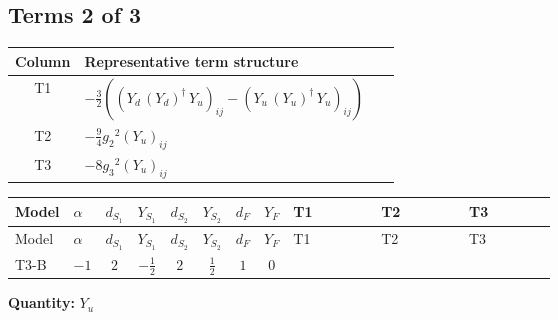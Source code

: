 \documentclass[8pt]{article}
\begin{document}
\begin{landscape}
\subsection*{Terms 2 of 3}
\begin{center}
\begin{tabular}{@{}c >{\raggedright\arraybackslash}p{0.82\linewidth}@{}}
\toprule
Column & Representative term structure \\
\midrule
T1 & \(\displaystyle -\frac{3}{2} (\left({Y_d}\,\left({Y_d}\right)^{\dagger}\,{Y_u}\right)_{ij}-\left({Y_u}\,\left({Y_u}\right)^{\dagger}\,{Y_u}\right)_{ij})\) \\
\midrule
T2 & \(\displaystyle -\frac{9}{4} {g_2}^2 \left({Y_u}\right)_{ij}\) \\
\midrule
T3 & \(\displaystyle -8 {g_3}^2 \left({Y_u}\right)_{ij}\) \\
\midrule
\bottomrule
\end{tabular}
\end{center}
\smallskip
\tiny
\begin{longtable}{@{}llcccccc >{\raggedright\arraybackslash}p{0.21\linewidth} >{\raggedright\arraybackslash}p{0.21\linewidth} >{\raggedright\arraybackslash}p{0.21\linewidth}@{}}
\toprule
Model & $\alpha$ & $d_{S_1}$ & $Y_{S_1}$ & $d_{S_2}$ & $Y_{S_2}$ & $d_F$ & $Y_F$ & T1 & T2 & T3 \\
\midrule
\endfirsthead
\toprule
Model & $\alpha$ & $d_{S_1}$ & $Y_{S_1}$ & $d_{S_2}$ & $Y_{S_2}$ & $d_F$ & $Y_F$ & T1 & T2 & T3 \\
\midrule
\endhead
T3-B & $-1$ & $2$ & $-\frac{1}{2}$ & $2$ & $\frac{1}{2}$ & $1$ & $0$ & \scriptsize\adjustbox{max width=\linewidth}{$\begin{gathered} -\frac{3}{2} (\left({Y_d}\,\left({Y_d}\right)^{\dagger}\,{Y_u}\right)_{ij}-\left({Y_u}\,\left({Y_u}\right)^{\dagger}\,{Y_u}\right)_{ij})\end{gathered}$} & \scriptsize\adjustbox{max width=\linewidth}{$\begin{gathered} -\frac{9}{4} {g_2}^2 \left({Y_u}\right)_{ij}\end{gathered}$} & \scriptsize\adjustbox{max width=\linewidth}{$\begin{gathered} -8 {g_3}^2 \left({Y_u}\right)_{ij}\end{gathered}$} \\
\midrule
\bottomrule
\end{longtable}
\clearpage
\noindent\textbf{Quantity: }$Y_u$\par\smallskip

\end{landscape}
\end{document}
